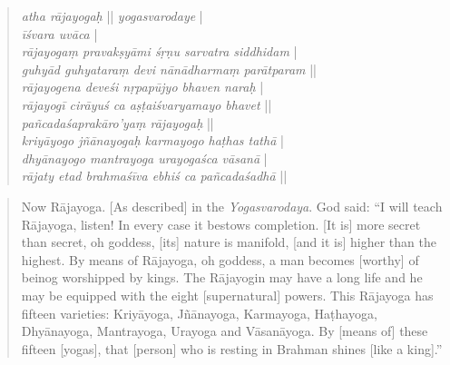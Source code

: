 \begin{quote}
\textit{atha rājayogaḥ} || \textit{yogasvarodaye} |\\
\textit{īśvara uvāca} |\\
\textit{rājayogaṃ pravakṣyāmi śṛṇu sarvatra siddhidam} |\\
\textit{guhyād guhyataraṃ devi nānādharmaṃ parātparam} ||\\
\textit{rājayogena deveśi nṛpapūjyo bhaven naraḥ} |\\
\textit{rājayogī cirāyuś ca aṣṭaiśvaryamayo bhavet} ||\\
\textit{pañcadaśaprakāro'yaṃ rājayogaḥ} ||\\
\textit{kriyāyogo jñānayogaḥ karmayogo haṭhas tathā} |\\
\textit{dhyānayogo mantrayoga urayogaśca vāsanā} |\\
\textit{rājaty etad brahmaśīva ebhiś ca pañcadaśadhā} ||\\
\end{quote}

\begin{quote}
Now Rājayoga. [As described] in the \emph{Yogasvarodaya}.
God said:
``I will teach Rājayoga, listen! In every case it bestows completion.
[It is] more secret than secret, oh goddess, [its] nature is manifold, [and it is] higher than the highest. 
By means of Rājayoga, oh goddess, a man becomes [worthy] of beinog worshipped by kings.
The Rājayogin may have a long life and he may be equipped with the eight [supernatural] powers.
This Rājayoga has fifteen varieties: Kriyāyoga, Jñānayoga, Karmayoga, Haṭhayoga,
Dhyānayoga, Mantrayoga, Urayoga and Vāsanāyoga.
By [means of] these fifteen [yogas], that [person] who is resting in Brahman shines [like a king].''
\end{quote}

